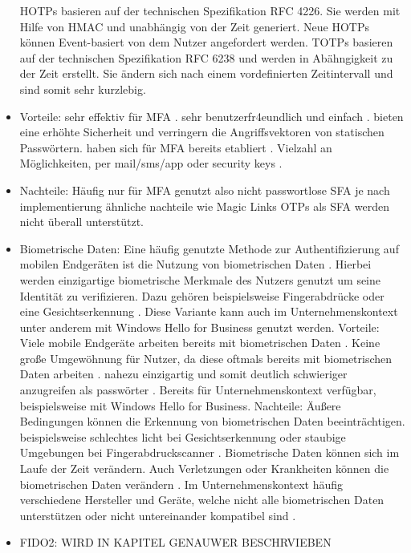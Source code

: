 \begin{itemize}
    \ac{HOTP}s basieren auf der technischen Spezifikation RFC 4226. Sie werden mit Hilfe von \ac{HMAC} und unabhängig von der Zeit generiert. Neue \ac{HOTP}s können Event-basiert von dem Nutzer angefordert werden. \cite{chowhan2019password}
    \ac{TOTP}s basieren auf der technischen Spezifikation RFC 6238 und werden in Abähngigkeit zu der Zeit erstellt. Sie ändern sich nach einem vordefinierten Zeitintervall und sind somit sehr kurzlebig. \cite{chowhan2019password}
    \item Vorteile:
    sehr effektiv für \ac{MFA} \cite{parmar2022comprehensive}.
    sehr benutzerfr4eundlich und einfach \cite{parmar2022comprehensive}.
    bieten eine erhöhte Sicherheit und verringern die Angriffsvektoren von statischen Passwörtern. \cite{chowhan2019password}
    haben sich für \ac{MFA} bereits etabliert \cite{parmar2022comprehensive}.
    Vielzahl an Möglichkeiten, per mail/sms/app oder security keys \cite{chowhan2019password} \cite{parmar2022comprehensive}.
    \item Nachteile:
    Häufig nur für \ac{MFA} genutzt also nicht passwortlose \ac{SFA} 
    je nach implementierung ähnliche nachteile wie Magic Links
    \ac{OTP}s als \ac{SFA} werden nicht überall unterstützt.
    
    \item Biometrische Daten:
    Eine häufig genutzte Methode zur Authentifizierung auf mobilen Endgeräten ist die Nutzung von biometrischen Daten \cite{parmar2022comprehensive}. 
    Hierbei werden einzigartige biometrische Merkmale des Nutzers genutzt um seine Identität zu verifizieren. Dazu gehören beispielsweise Fingerabdrücke oder eine Gesichtserkennung \cite{parmar2022comprehensive}. Diese Variante kann auch im Unternehmenskontext unter anderem mit Windows Hello for Business genutzt werden.
    Vorteile:
    Viele mobile Endgeräte arbeiten bereits mit biometrischen Daten \cite{parmar2022comprehensive}.
    Keine große Umgewöhnung für Nutzer, da diese oftmals bereits mit biometrischen Daten arbeiten \cite{parmar2022comprehensive}.
    nahezu einzigartig und somit deutlich schwieriger anzugreifen als passwörter \cite{parmar2022comprehensive}.
    Bereits für Unternehmenskontext verfügbar, beispielsweise mit Windows Hello for Business.
    Nachteile:
    Äußere Bedingungen können die Erkennung von biometrischen Daten beeinträchtigen. beispielsweise schlechtes licht bei Gesichtserkennung oder staubige Umgebungen bei Fingerabdruckscanner \cite{parmar2022comprehensive}.
    Biometrische Daten können sich im Laufe der Zeit verändern. Auch Verletzungen oder Krankheiten können die biometrischen Daten verändern \cite{boonkrong2012security}.
    Im Unternehmenskontext häufig verschiedene Hersteller und Geräte, welche nicht alle biometrischen Daten unterstützen oder nicht untereinander kompatibel sind \cite{parmar2022comprehensive}.

    \item FIDO2:
    WIRD IN KAPITEL GENAUWER BESCHRVIEBEN


\end{itemize}

